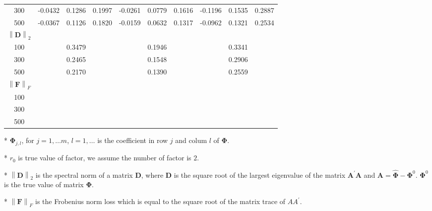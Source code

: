 \documentclass[12pt,a4paper,hyperref]{article}
\begin{document}
\begin{table}[H]
\begin{threeparttable}
\begin{tabular} {*{10}{c}}
300& -0.0432 &0.1286 & 0.1997&	-0.0261 &0.0779&0.1616&-0.1196 &0.1535 & 0.2887\\
500& -0.0367& 0.1126 & 0.1820  &	-0.0159 &	0.0632& 0.1317& -0.0962& 0.1321&	0.2534  \\
\cmidrule(lr){1-10}
$\left\| \boldsymbol{D} \right\|_{2} $\\
\cmidrule(lr){1-4}   \cmidrule(lr){5-7}   \cmidrule(lr){8-10}
100&  &0.3479& &	  &	0.1946& & &0.3341&   \\
300&   &0.2465 & &	  &	0.1548&	& &0.2906&  \\
500& & 0.2170&   &	  &	0.1390& & & 0.2559&	  \\
\cmidrule(lr){1-10}
$\left\| \boldsymbol{F} \right\|_{F} $\\
\cmidrule(lr){1-4}   \cmidrule(lr){5-7}   \cmidrule(lr){8-10}
100&  & & &	  &	& & & &   \\
300&   &  & &	  &	&	& & &  \\
500& &  &   &	  &	& & & &	  \\
\bottomrule
\end{tabular}
\begin{tablenotes}
\footnotesize
  \item[*] $\boldsymbol{\Phi}_{j,l}$, for $j=1,\ldots m$, $l=1,\ldots$ is the coefficient in row $j$ and colum $l$ of $\boldsymbol{\Phi}$.
\item[*] $r_{0}$ is true value of factor, we assume the number of factor is $2$.
 \item[*] $\left\| \boldsymbol{D} \right\|_{2}$ is the spectral norm of a matrix $\boldsymbol{D}$, where $\boldsymbol{D}$ is the square root of the largest eigenvalue of the matrix $\boldsymbol{A}^{'}\boldsymbol{A}$ and $\boldsymbol{A}=\hat{\boldsymbol{\Phi}}- \boldsymbol{\Phi}^{0}$. $\boldsymbol{\Phi}^{0}$ is the true value of matrix $\boldsymbol{\Phi}$.
 \item[*] $\left\| \boldsymbol{F} \right\|_{F} $ is the Frobenius norm loss which is equal to the square root of the matrix trace of $AA^{'}$.
    \end{tablenotes}
\end{threeparttable}
\end{table}
\end{document}
